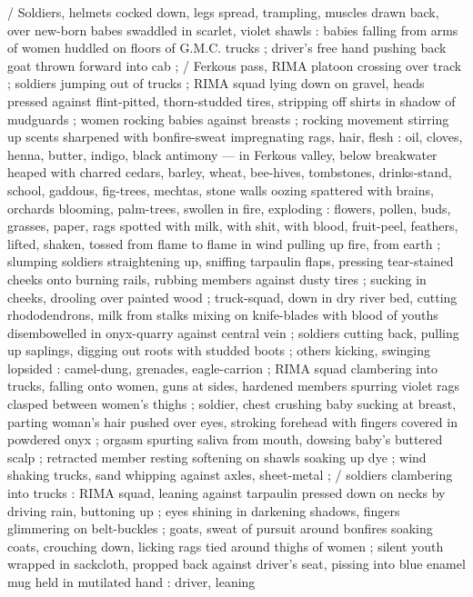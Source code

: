\documentclass[10pt,twoside]{memoir}
\begin{document}
/ Soldiers, helmets cocked down, legs spread, trampling, muscles
drawn back, over new-born babes swaddled in scarlet, violet shawls 
: babies falling from arms of women huddled on floors of G.M.C.
trucks ; driver's free hand pushing back goat thrown forward into cab
; / Ferkous pass, RIMA platoon crossing over track ; soldiers jumping 
out of trucks ; RIMA squad lying down on gravel, heads pressed 
against flint-pitted, thorn-studded tires, stripping off shirts in 
shadow of mudguards ; women rocking babies against breasts ; 
rocking movement stirring up scents sharpened with bonfire-sweat 
impregnating rags, hair, flesh : oil, cloves, henna, butter, indigo, 
black antimony --- in Ferkous valley, below breakwater heaped with 
charred cedars, barley, wheat, bee-hives, tombstones, drinks-stand, 
school, gaddous, fig-trees, mechtas, stone walls oozing spattered 
with brains, orchards blooming, palm-trees, swollen in fire, exploding
: flowers, pollen, buds, grasses, paper, rags spotted with milk, with 
shit, with blood, fruit-peel, feathers, lifted, shaken, tossed from
flame to flame in wind pulling up fire, from earth ; slumping soldiers
straightening up, sniffing tarpaulin flaps, pressing tear-stained 
cheeks onto burning rails, rubbing members against dusty tires ;
sucking in cheeks, drooling over painted wood ; truck-squad, down 
in dry river bed, cutting rhododendrons, milk from stalks mixing on 
knife-blades with blood of youths disembowelled in onyx-quarry 
against central vein ; soldiers cutting back, pulling up saplings, 
digging out roots with studded boots ; others kicking, swinging 
lopsided : camel-dung, grenades, eagle-carrion ; RIMA squad 
clambering into trucks, falling onto women, guns at sides, hardened 
members spurring violet rags clasped between women's thighs ; 
soldier, chest crushing baby sucking at breast, parting woman's hair 
pushed over eyes, stroking forehead with fingers covered in 
powdered onyx ; orgasm spurting saliva from mouth, dowsing baby's 
buttered scalp ; retracted member resting softening on shawls 
soaking up dye ; wind shaking trucks, sand whipping against axles, 
sheet-metal ; / soldiers clambering into trucks : RIMA squad, leaning 
against tarpaulin pressed down on necks by driving rain, buttoning 
up ; eyes shining in darkening shadows, fingers glimmering on belt-buckles 
; goats, sweat of pursuit around bonfires soaking coats, 
crouching down, licking rags tied around thighs of women ; silent 
youth wrapped in sackcloth, propped back against driver's seat, 
pissing into blue enamel mug held in mutilated hand : driver, leaning 
\end{document}
